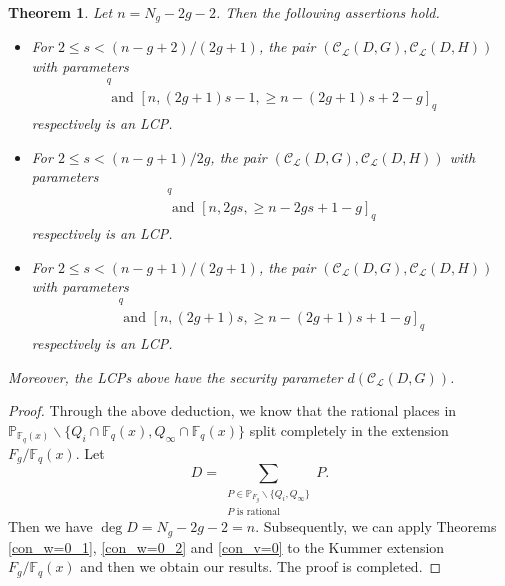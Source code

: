 \documentclass[journal,12pt,onecolumn]{IEEEtran}
\newtheorem{theorem}{Theorem}
\begin{document}
\begin{theorem}\label{LCP_HEC}
    Let $n = N_g-2g-2$. Then the following assertions hold.
    \begin{itemize}
        \item For $2\le s <(n-g+2)/(2g+1)$, the pair $(\mathcal{C}_{\mathcal{L}}(D,G),\mathcal{C}_{\mathcal{L}}(D,H))$ with parameters
        \begin{gather*}
            [n,n-(2g+1)s+1,\ge (2g+1)s-g]_q\\
            \text{ and }[n,(2g+1)s-1,\ge n-(2g+1)s+2-g]_q
        \end{gather*}
        respectively is an LCP. 
        \item For $2\le s <(n-g+1)/2g$, the pair $(\mathcal{C}_{\mathcal{L}}(D,G),\mathcal{C}_{\mathcal{L}}(D,H))$ with parameters
        \begin{gather*}
            [n,n-2gs,\ge 2gs+1-g]_q\\
            \text{ and }[n,2gs,\ge n-2gs+1-g]_q
        \end{gather*}
        respectively is an LCP. 
        \item For $2\le s <(n-g+1)/(2g+1)$, the pair $(\mathcal{C}_{\mathcal{L}}(D,G),\mathcal{C}_{\mathcal{L}}(D,H))$ with parameters
        \begin{gather*}
            [n,n-(2g+1)s,\ge (2g+1)s+1-g]_q\\
            \text{ and }[n,(2g+1)s,\ge n-(2g+1)s+1-g]_q
        \end{gather*}
        respectively is an LCP. 
    \end{itemize}
    Moreover, the LCPs above have the security parameter $d(\mathcal{C}_{\mathcal{L}}(D,G))$. 
\end{theorem}
\begin{proof}
    Through the above deduction, we know that the rational places in $\mathbb{P}_{\mathbb{F}_q(x)}\backslash\{Q_i\cap\mathbb{F}_q(x),Q_\infty\cap\mathbb{F}_q(x)\}$ split completely in the extension $F_g/\mathbb{F}_q(x)$. Let 
    \[
        D = \sum_{\substack{P\in\mathbb{P}_{F_g}\backslash\{Q_i,Q_\infty\}\\  P \text{ is rational}}}P.
    \]
    Then we have $\deg D = N_g-2g-2 = n$. Subsequently, we can apply Theorems \ref{con_w=0_1}, \ref{con_w=0_2} and \ref{con_v=0} to the Kummer extension $F_g/\mathbb{F}_q(x)$ and then we obtain our results. The proof is completed. 
\end{proof}
\end{document}
